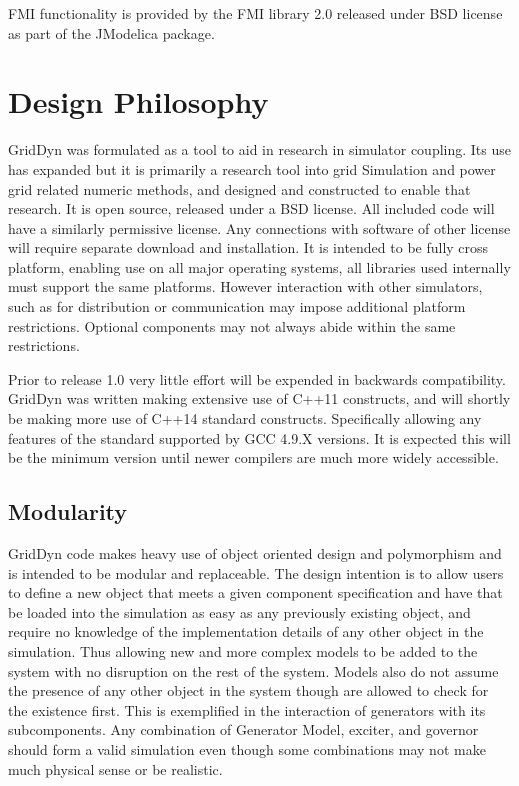 \documentclass[12pt]{article} %
\begin{document}
FMI functionality is provided by the FMI library 2.0 released under BSD license as part of the JModelica package.

\section {Design Philosophy}
GridDyn was formulated as a tool to aid in research in simulator coupling.  Its use has expanded but it is primarily a research tool into grid Simulation and power grid related numeric methods, and designed and constructed to enable that research.  It is open source, released under a BSD license.  All included code will have a similarly permissive license.  Any connections with software of other license will require separate download and installation.  It is intended to be fully cross platform,  enabling use on all major operating systems,  all libraries used internally must support the same platforms.  However interaction with other simulators, such as for distribution or communication may impose additional platform restrictions.  Optional components may not always abide within the same restrictions.

Prior to release 1.0 very little effort will be expended in backwards compatibility.  GridDyn was written making extensive use of C++11 constructs, and will shortly be making more use of C++14 standard constructs.  Specifically allowing any features of the standard supported by GCC 4.9.X versions.  It is expected this will be the minimum version until newer compilers are much more widely accessible.

\subsection{Modularity}
GridDyn code makes heavy use of object oriented design and polymorphism and is intended to be modular and replaceable.  The design intention is to allow users to define a new object that meets a given component specification and have that be loaded into the simulation as easy as any previously existing object, and require no knowledge of the implementation details of any other object in the simulation.  Thus allowing new and more complex models to be added to the system with no disruption on the rest of the system.  Models also do not assume the presence of any other object in the system though are allowed to check for the existence first.  This is exemplified in the interaction of generators with its subcomponents.  Any combination of Generator Model, exciter, and governor should form a valid simulation even though some combinations may not make much physical sense or be realistic.
\end{document}
